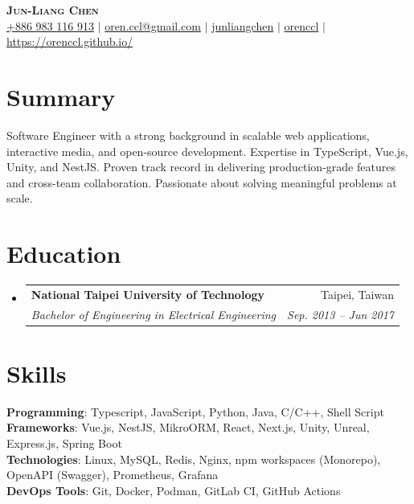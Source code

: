 \documentclass[letterpaper,11pt]{article}
\makeatletter
\newcommand{\resumeSubheading}[4]{
  \vspace{-2pt}\item
    \begin{tabular*}{0.97\textwidth}[t]{l@{\extracolsep{\fill}}r}
      \textbf{#1} & #2 \\
      \textit{\small#3} & \textit{\small #4} \\
    \end{tabular*}\vspace{-3pt}
}
\newcommand{\resumeSubHeadingListStart}{\begin{itemize}[leftmargin=0.15in, label={}]}
\newcommand{\resumeSubHeadingListEnd}{\end{itemize}}
\makeatother
\begin{document}

\begin{center}
    \textbf{\Huge \scshape Jun-Liang Chen} \\ \vspace{1pt}
     \href{tel:886983116913}{{+886 983 116 913}} $|$
     \href{mailto:oren.ccl@gmail.com}{{oren.ccl@gmail.com}} $|$
     \href{https://www.linkedin.com/in/jun-liang-chen-6a7743188/}{{junliangchen}} $|$
     \href{https://github.com/orenccl}{{orenccl}} $|$
     \href{https://orenccl.github.io/}{{https://orenccl.github.io/}}
\end{center}

\section{Summary}
\small{Software Engineer with a strong background in scalable web applications, interactive media, and open-source development. Expertise in TypeScript, Vue.js, Unity, and NestJS. Proven track record in delivering production-grade features and cross-team collaboration. Passionate about solving meaningful problems at scale. }

\section{Education}
  \resumeSubHeadingListStart
    \resumeSubheading
      {National Taipei University of Technology}{Taipei, Taiwan}
      {Bachelor of Engineering in Electrical Engineering}{Sep. 2013 -- Jun 2017}
  \resumeSubHeadingListEnd

\section{Skills}
 \begin{itemize}[leftmargin=0.15in, label={}]
    \small{\item{
     \textbf{Programming}{: Typescript, JavaScript, Python, Java, C/C++, Shell Script} \\
     \textbf{Frameworks}{: Vue.js, NestJS, MikroORM, React, Next.js, Unity, Unreal, Express.js, Spring Boot} \\
     \textbf{Technologies}{: Linux, MySQL, Redis, Nginx, npm workspaces (Monorepo), OpenAPI (Swagger), Prometheus, Grafana} \\
     \textbf{DevOps Tools}{: Git, Docker, Podman, GitLab CI, GitHub Actions}
    }}
 \end{itemize}
\end{document}
